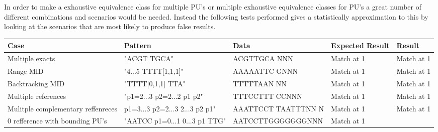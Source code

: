 \documentclass[12pt]{article}
\newcommand{\textapprox}{\raisebox{0.5ex}{\texttildelow}}
\newcommand{\pus}{PU's }
\begin{document}
In order to make a exhaustive equivalence class for multiple \pus or multiple exhaustive equivalence classes for \pus
a great number of different combinations and scenarios would be needed. Instead the following tests performed gives a 
statistically approximation to this by looking at the scenarios that are most likely to produce false results.

\begin{table}[H]
\begin{tabular}{p{4cm}|p{3cm}|p{2.5cm}|p{2.5cm}|p{2.5cm}}
Case 			& Pattern & Data & Expected Result & Result \\ \hline
Multiple exacts 	& "ACGT TGCA" & ACGTTGCA NNN & Match at 1 & Match at 1\\ \hline
Range MID		& "4...5 TTTT[1,1,1]" & AAAAATTC GNNN & Match at 1 & Match at 1\\ \hline
Backtracking MID & "TTTT[0,1,1] TTA" & TTTTTAAN NN & Match at 1 & Match at 1\\ \hline
Multiple references & "p1=2...3 p2=2...2 p1 p2" & TTTCCTTT CCNNN & Match at 1 & Match at 1\\ \hline
Mulitple complementary reffenreces & p1=3...3 p2=2...3 2...3 \textapprox p2 \textapprox p1" & 
AAATTCCT TAATTTNN N & Match at 1 & Match at 1 \\ \hline
0 refference with bounding \pus & "AATCC p1=0...1 0...3 p1 TTG" & AATCCTTGGGGGGGNNN & Match at 1 & \\ \hline
\end{tabular}
\end{table} 
\end{document}
